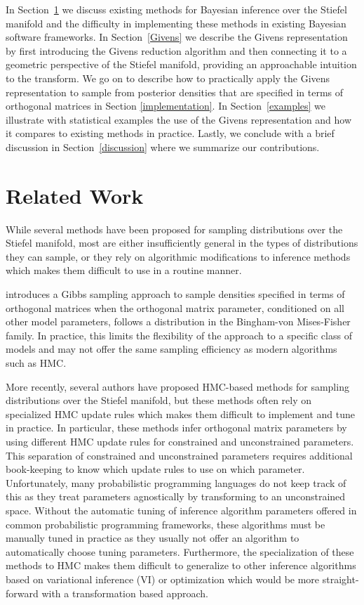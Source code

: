 \documentclass[ba]{imsart}
\numberwithin{equation}{section}
\theoremstyle{plain}
\begin{document}
\noindent In Section~\ref{related} we discuss existing methods for Bayesian inference over the Stiefel manifold and the difficulty in implementing these methods in existing Bayesian software frameworks. In Section~\ref{Givens} we describe the Givens representation by first introducing the Givens reduction algorithm and then connecting it to a geometric perspective of the Stiefel manifold, providing an approachable intuition to the transform. We go on to describe how to practically apply the Givens representation to sample from posterior densities that are specified in terms of orthogonal matrices in Section \ref{implementation}. In Section~\ref{examples} we illustrate with statistical examples the use of the Givens representation and how it compares to existing methods in practice. Lastly, we conclude with a brief discussion in Section~\ref{discussion} where we summarize our contributions.

\section{Related Work} \label{related}
While several methods have been proposed for sampling distributions over the Stiefel manifold, most are either insufficiently general in the types of distributions they can sample, or they rely on algorithmic modifications to inference methods which makes them difficult to use in a routine manner.

\noindent \cite{hoff2009simulation} introduces a Gibbs sampling approach to sample densities specified in terms of orthogonal matrices when the orthogonal matrix parameter, conditioned on all other model parameters, follows a distribution in the Bingham-von Mises-Fisher family. In practice, this limits the flexibility of the approach to a specific class of models and may not offer the same sampling efficiency as modern algorithms such as HMC. 

\noindent More recently, several authors have proposed HMC-based methods for sampling distributions over the Stiefel manifold, but these methods often rely on specialized HMC update rules which makes them difficult to implement and tune in practice. In particular, these methods infer orthogonal matrix parameters by using different HMC update rules for constrained and unconstrained parameters. This separation of constrained and unconstrained parameters requires additional book-keeping to know which update rules to use on which parameter. Unfortunately, many probabilistic programming languages do not keep track of this as they treat parameters agnostically by transforming to an unconstrained space. Without the automatic tuning of inference algorithm parameters offered in common probabilistic programming frameworks, these algorithms must be manually tuned in practice as they usually not offer an algorithm to automatically choose tuning parameters. Furthermore, the specialization of these methods to HMC makes them difficult to generalize to other inference algorithms based on variational inference (VI) or optimization which would be more straight-forward with a transformation based approach.
\end{document}
